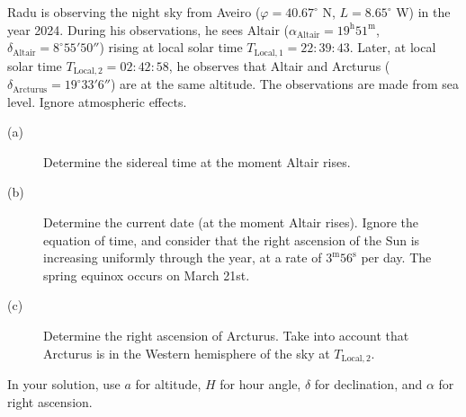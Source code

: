 Radu is observing the night sky from Aveiro ($\varphi=40.67^\circ$ N, $L=8.65^\circ$ W) in the year 2024. During his observations, he sees Altair ($\alpha_{\mathrm{Altair}}=19^{\mathrm h}51^{\mathrm m}$, $\delta_{\mathrm{Altair}}=8^\circ55'50''$) rising at local solar time $T_{\mathrm{Local},1}=22{:}39{:}43$. Later, at local solar time $T_{\mathrm{Local},2}=02{:}42{:}58$, he observes that Altair and Arcturus ($\delta_{\mathrm{Arcturus}}=19^\circ33'6''$) are at the same altitude. The observations are made from sea level. Ignore atmospheric effects.
\begin{description}
\item[(a)] Determine the sidereal time at the moment Altair rises.
\item[(b)] Determine the current date (at the moment Altair rises). Ignore the equation of time, and consider that the right ascension of the Sun is increasing uniformly through the year, at a rate of $3^{\mathrm m}56^{\mathrm s}$ per day. The spring equinox occurs on March 21st.
\item[(c)] Determine the right ascension of Arcturus. Take into account that Arcturus is in the Western hemisphere of the sky at $T_{\mathrm{Local},2}$.
\end{description}
In your solution, use $a$ for altitude, $H$ for hour angle, $\delta$ for declination, and $\alpha$ for right ascension.
